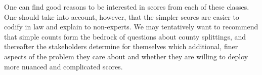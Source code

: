 \documentclass{mgggarticle}
\begin{document}
One can find good reasons to be interested in scores from each of these classes. One should take into account, however, that the simpler scores are easier to codify in law and explain to non-experts. We may tentatively want to recommend that simple counts form the bedrock of questions about county splittings, and thereafter the stakeholders determine for themselves which additional, finer aspects of the problem they care about and whether they are willing to deploy more nuanced and complicated scores.
\end{document}

